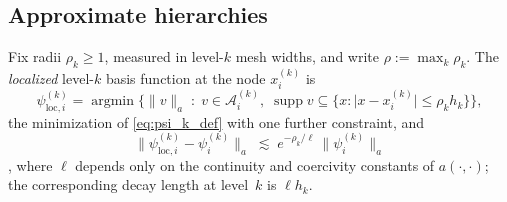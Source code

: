 \documentclass[hidelinks]{siamart}
\theoremstyle{nonumberplain}
\numberwithin{theorem}{section}
\begin{document}
\subsection{Approximate hierarchies}\label{subsec:loc}
Fix radii $\rho_k \geq 1$, measured in level-$k$ mesh widths, and write
$\rho := \max_k \rho_k$.  The \emph{localized} level-$k$ basis function at the node $x^{(k)}_i$ is
\begin{equation}\label{eq:psi_loc_def}
  \psi^{(k)}_{\mathrm{loc},i} = \operatorname*{argmin}
    \bigl\{ \lVert v \rVert_a \;:\; v \in \mathcal{A}^{(k)}_i, \;
    \operatorname{supp} v \subseteq
      \{ x : \lvert x - x^{(k)}_i \rvert \leq \rho_k h_k \} \bigr\} ,
\end{equation}
the minimization of \eqref{eq:psi_k_def} with one further constraint,
and
\begin{equation}\label{eq:loc_error}
  \bigl\lVert \psi^{(k)}_{\mathrm{loc},i} - \psi^{(k)}_i \bigr\rVert_a
  \;\lesssim\; e^{-\rho_k/\ell} \,
  \bigl\lVert \psi^{(k)}_i \bigr\rVert_a
\end{equation}
\cite[Thm.~15.41]{Owhadi_Scovel_2019}, where $\ell$ depends only on the
continuity and coercivity constants of $a(\cdot,\cdot)$; the
corresponding decay length at level~$k$ is $\ell h_k$.
\end{document}
